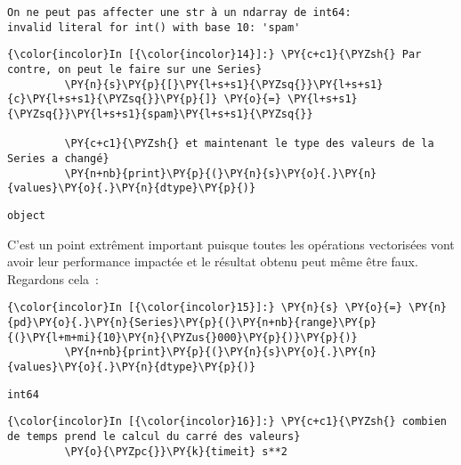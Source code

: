     \begin{Verbatim}[commandchars=\\\{\},frame=single,framerule=0.3mm,rulecolor=\color{cellframecolor}]
On ne peut pas affecter une str à un ndarray de int64:
invalid literal for int() with base 10: 'spam'
\end{Verbatim}

    \begin{Verbatim}[commandchars=\\\{\},frame=single,framerule=0.3mm,rulecolor=\color{cellframecolor}]
{\color{incolor}In [{\color{incolor}14}]:} \PY{c+c1}{\PYZsh{} Par contre, on peut le faire sur une Series}
         \PY{n}{s}\PY{p}{[}\PY{l+s+s1}{\PYZsq{}}\PY{l+s+s1}{c}\PY{l+s+s1}{\PYZsq{}}\PY{p}{]} \PY{o}{=} \PY{l+s+s1}{\PYZsq{}}\PY{l+s+s1}{spam}\PY{l+s+s1}{\PYZsq{}}
         
         \PY{c+c1}{\PYZsh{} et maintenant le type des valeurs de la Series a changé}
         \PY{n+nb}{print}\PY{p}{(}\PY{n}{s}\PY{o}{.}\PY{n}{values}\PY{o}{.}\PY{n}{dtype}\PY{p}{)}
\end{Verbatim}


    \begin{Verbatim}[commandchars=\\\{\},frame=single,framerule=0.3mm,rulecolor=\color{cellframecolor}]
object
\end{Verbatim}

    C'est un point extrêment important puisque toutes les opérations
vectorisées vont avoir leur performance impactée et le résultat obtenu
peut même être faux. Regardons cela~:

    \begin{Verbatim}[commandchars=\\\{\},frame=single,framerule=0.3mm,rulecolor=\color{cellframecolor}]
{\color{incolor}In [{\color{incolor}15}]:} \PY{n}{s} \PY{o}{=} \PY{n}{pd}\PY{o}{.}\PY{n}{Series}\PY{p}{(}\PY{n+nb}{range}\PY{p}{(}\PY{l+m+mi}{10}\PY{n}{\PYZus{}000}\PY{p}{)}\PY{p}{)}
         \PY{n+nb}{print}\PY{p}{(}\PY{n}{s}\PY{o}{.}\PY{n}{values}\PY{o}{.}\PY{n}{dtype}\PY{p}{)}
\end{Verbatim}


    \begin{Verbatim}[commandchars=\\\{\},frame=single,framerule=0.3mm,rulecolor=\color{cellframecolor}]
int64
\end{Verbatim}

    \begin{Verbatim}[commandchars=\\\{\},frame=single,framerule=0.3mm,rulecolor=\color{cellframecolor}]
{\color{incolor}In [{\color{incolor}16}]:} \PY{c+c1}{\PYZsh{} combien de temps prend le calcul du carré des valeurs}
         \PY{o}{\PYZpc{}}\PY{k}{timeit} s**2
\end{Verbatim}


